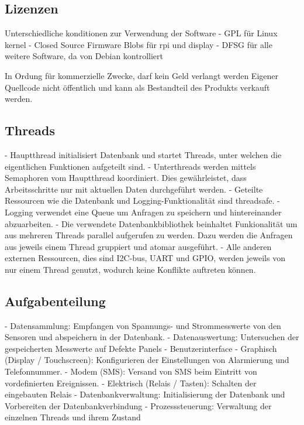 \subsection{Lizenzen}
\label{subsec:software:master:licenses}

Unterschiedliche konditionen zur Verwendung der Software
 - GPL für Linux kernel
 - Closed Source Firmware Blobs für rpi und display
 - DFSG für alle weitere Software, da von Debian kontrolliert

In Ordung für kommerzielle Zwecke, darf kein Geld verlangt werden
Eigener Quellcode nicht öffentlich und kann als Bestandteil des Produkts verkauft werden.


\subsection{Threads}
\label{subsec:software:master:threads}

 - Hauptthread initialisiert Datenbank und startet Threads, unter welchen die eigentlichen Funktionen aufgeteilt sind.
 - Unterthreads werden mittels Semaphoren vom Hauptthread koordiniert. Dies gewährleistet, dass Arbeitsschritte nur mit aktuellen Daten durchgeführt werden.
 - Geteilte Ressourcen wie die Datenbank und Logging-Funktionalität sind threadsafe.
    - Logging verwendet eine Queue um Anfragen zu speichern und hintereinander abzuarbeiten.
    - Die verwendete Datenbankbibliothek beinhaltet Funkionalität um aus mehreren Threads parallel aufgerufen zu werden. Dazu werden die Anfragen aus jeweils einem Thread gruppiert und atomar ausgeführt.
 - Alle anderen externen Ressourcen, dies sind I2C-bus, UART und GPIO, werden jeweils von nur einem Thread genutzt, wodurch keine Konflikte auftreten können.


\subsection{Aufgabenteilung}
\label{subsec:software:master:taskSeparation}

 - Datensammlung: Empfangen von Spannungs- und Strommesswerte von den Sensoren und abspeichern in der Datenbank.
 - Datenauswertung: Untersuchen der gespeicherten Messwerte auf Defekte Panels
 - Benutzerinterface
   - Graphisch (Display / Touchscreen): Konfigurieren der Einstellungen von Alarmierung und Telefonnummer.
   - Modem (SMS): Versand von SMS beim Eintritt von vordefinierten Ereignissen.
   - Elektrisch (Relais / Tasten): Schalten der eingebauten Relais
 - Datenbankverwaltung: Initialisierung der Datenbank und Vorbereiten der Datenbankverbindung
 - Prozesssteuerung: Verwaltung der einzelnen Threads und ihrem Zustand


